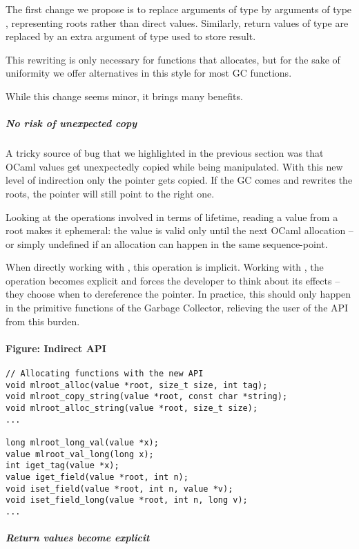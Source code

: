 \documentclass[a4paper]{easychair}
\newcommand{\cpp}[1]{\smash{\lstinline[style=C++]{#1}}}
\begin{document}
The first change we propose is to replace arguments of type \cpp{value}
by arguments of type \cpp{value*}, representing roots rather than direct values.
Similarly, return values of type \cpp{value} are replaced by an extra argument
of type \cpp{value*} used to store result.

This rewriting is only necessary for functions that allocates, but for the sake
of uniformity we offer alternatives in this style for most GC functions.

While this change seems minor, it brings many benefits.

\subparagraph{No risk of unexpected copy}

A tricky source of bug that we highlighted in the previous section was
that OCaml values get unexpectedly copied while being manipulated. With
this new level of indirection only the pointer gets copied. If the GC
comes and rewrites the roots, the pointer will still point to the right
one.

Looking at the operations involved in terms of lifetime, reading a value
from a root makes it ephemeral: the value is valid only until the next
OCaml allocation -- or simply undefined if an allocation can happen in
the same sequence-point.

When directly working with \cpp{value}, this operation is implicit.
Working with \cpp{value*}, the operation becomes explicit and forces
the developer to think about its effects -- they choose when to
dereference the pointer. In practice, this should only happen in the
primitive functions of the Garbage Collector, relieving the user of the
API from this burden.

\paragraph{Figure: Indirect API}

\begin{lstlisting}[style=C++]
// Allocating functions with the new API
void mlroot_alloc(value *root, size_t size, int tag);
void mlroot_copy_string(value *root, const char *string);
void mlroot_alloc_string(value *root, size_t size);
...
    
long mlroot_long_val(value *x);
value mlroot_val_long(long x);
int iget_tag(value *x);
value iget_field(value *root, int n);
void iset_field(value *root, int n, value *v);
void iset_field_long(value *root, int n, long v);
...
\end{lstlisting}

\subparagraph{Return values become explicit}
\end{document}
